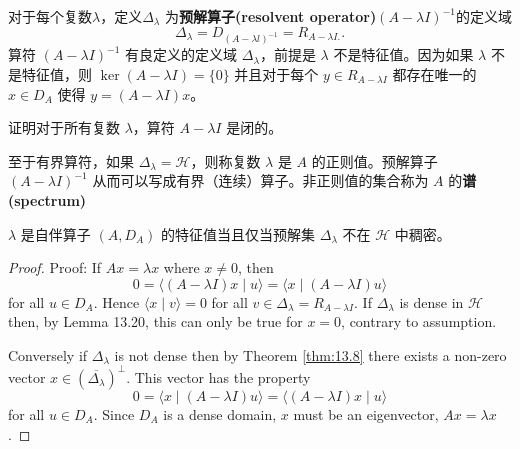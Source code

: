 对于每个复数\(\lambda\)，定义\(\Delta_{\lambda}\) 为\textbf{预解算子(resolvent operator)}\((A-\lambda I)^{-1}\)的定义域
\[
\Delta_{\lambda}=D_{(A-\lambda l)^{-1}}=R_{A-\lambda I .} .
\]
算符 \((A-\lambda I)^{-1}\) 有良定义的定义域 \(\Delta_{\lambda}\)，前提是 \(\lambda\) 不是特征值。因为如果 \(\lambda\) 不是特征值，则 \(\operatorname{ker}(A-\lambda I)=\{0\}\) 并且对于每个 \(y \in R_{A-\lambda I}\) 都存在唯一的 \(x\in D_{A}\) 使得 \(y=(A-\lambda I) x\)。
\begin{exercise}
    证明对于所有复数 \(\lambda\)，算符 \(A-\lambda I\) 是闭的。
\end{exercise}
至于有界算符，如果 \(\Delta_{\lambda}=\mathcal{H}\)，则称复数 \(\lambda\) 是 \(A\) 的正则值。预解算子 \((A-\lambda I)^{-1}\) 从而可以写成有界（连续）算子。非正则值的集合称为 \(A\) 的\textbf{谱(spectrum)}
\begin{theorem}
    \( \lambda\) 是自伴算子 \(\left(A, D_{A}\right)\) 的特征值当且仅当预解集 \(\Delta_{\lambda}\) 不在 \(\mathcal{H}\) 中稠密。
\end{theorem}
\begin{proof}
    Proof: If \(A x=\lambda x\) where \(x \neq 0\), then
\[
0=\langle(A-\lambda I) x \mid u\rangle=\langle x \mid(A-\lambda I) u\rangle
\] 
for all \(u \in D_{A}\). Hence \(\langle x \mid v\rangle=0\) for all \(v \in \Delta_{\lambda}=R_{A-\lambda I}\). If \(\Delta_{\lambda}\) is dense in \(\mathcal{H}\) then, by Lemma 13.20, this can only be true for \(x=0\), contrary to assumption.

Conversely if \(\Delta_{\lambda}\) is not dense then by Theorem \ref{thm:13.8} there exists a non-zero vector \(x \in\left(\overline{\Delta_{\lambda}}\right)^{\perp}\). This vector has the property
\[
0=\langle x \mid(A-\lambda I) u\rangle=\langle(A-\lambda I) x \mid u\rangle
\]
for all \(u \in D_{A}\). Since \(D_{A}\) is a dense domain, \(x\) must be an eigenvector, \(A x=\lambda x\).
\end{proof}
